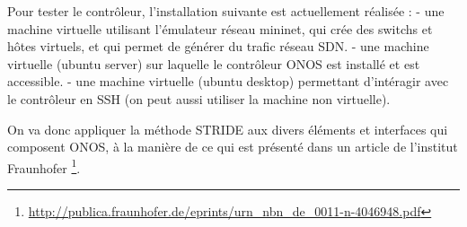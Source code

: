 Pour tester le contrôleur, l’installation suivante est actuellement réalisée :
- une machine virtuelle utilisant l'émulateur réseau mininet, qui crée des switchs et hôtes virtuels, et qui permet de générer du trafic réseau SDN.
- une machine virtuelle (ubuntu server) sur laquelle le contrôleur ONOS est installé et est accessible.
- une machine virtuelle (ubuntu desktop) permettant d’intéragir avec le contrôleur en SSH (on peut aussi utiliser la machine non virtuelle).

On va donc appliquer la méthode STRIDE aux divers éléments et interfaces qui composent ONOS, à la manière de ce qui est présenté dans un article de l'institut Fraunhofer \footnote{\url{http://publica.fraunhofer.de/eprints/urn_nbn_de_0011-n-4046948.pdf}}.
